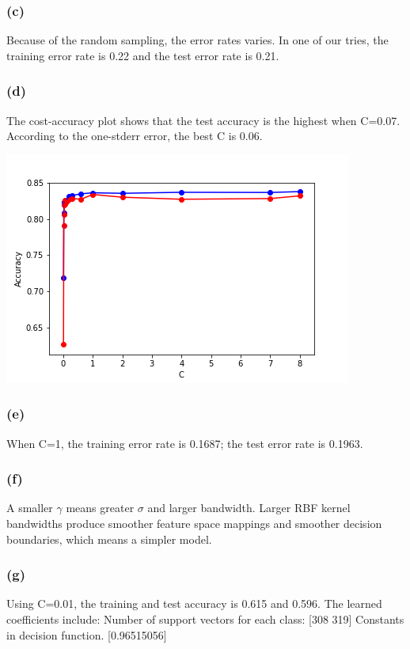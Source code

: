 \documentclass[12pt]{article}
\begin{document}
{\subsubsection*{(c)}
Because of the random sampling, the error rates varies. In one of our tries, the training error rate is 0.22 and the test error rate is 0.21. 

\subsubsection*{(d)}
The cost-accuracy plot shows that the test accuracy is the highest when C=0.07. According to the one-stderr error, the best C is 0.06. 

\begin{center}
\includegraphics[scale=0.8]{P2/cross_validation_linear.png}
\end{center}

\subsubsection*{(e)}
When C=1, the training error rate is 0.1687; the test error rate is 0.1963. 


\subsubsection*{(f)}
A smaller $\gamma$ means greater $\sigma$ and larger bandwidth. Larger RBF kernel bandwidths produce smoother feature space mappings and smoother decision boundaries, which means a simpler model. 


\subsubsection*{(g)}
Using C=0.01, the training and test accuracy is 0.615 and 0.596. The learned coefficients include: \newline
Number of support vectors for each class: [308 319] \newline
Constants in decision function. [0.96515056]

}
\end{document}
